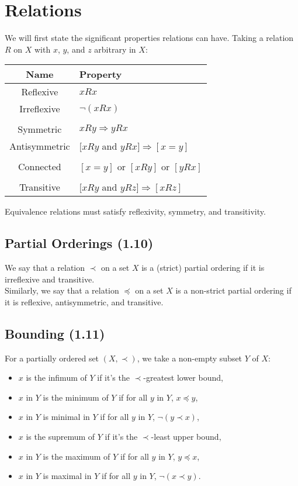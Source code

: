\section{Relations}

We will first state the significant properties relations
can have. Taking a relation $R$ on $X$ with $x$, $y$, and $z$
arbitrary in $X$: \begin{center}
    \begin{tabular}{ c l }
        \textbf{Name} & \textbf{Property} \\
        \hline
        Reflexive & $xRx$ \\
        Irreflexive & $\neg(xRx)$ \\
        \\
        Symmetric & $xRy \Rightarrow yRx$ \\
        Antisymmetric & $[xRy$ and $yRx] \Rightarrow [x = y]$ \\
        \\
        Connected & $[x = y]$ or $[xRy]$ or $[yRx]$ \\
        \\
        Transitive & $[xRy$ and $yRz] \Rightarrow [xRz]$ \\
    \end{tabular}
\end{center} Equivalence relations must satisfy 
reflexivity, symmetry, and transitivity.

\subsection{Partial Orderings (1.10)} \label{1.10}

We say that a relation $\prec$ on a set $X$ is a (strict) partial
ordering if it is irreflexive and transitive.
\\[\baselineskip]
Similarly, we say that a relation $\preceq$ on a set $X$ is a non-strict
partial ordering if it is reflexive, antisymmetric, and transitive.

\subsection{Bounding (1.11)} \label{1.11}

For a partially ordered set $(X, \prec)$, we take a non-empty subset $Y$ of $X$: 
\begin{itemize}
    \item $x$ is the infimum of $Y$ if it's the $\prec$-greatest lower bound,
    \item $x$ in $Y$ is the minimum of $Y$ if for all $y$ in $Y$, $x \preceq y$,
    \item $x$ in $Y$ is minimal in $Y$ if for all $y$ in $Y$, $\neg(y \prec x)$,
    \item $x$ is the supremum of $Y$ if it's the $\prec$-least upper bound,
    \item $x$ in $Y$ is the maximum of $Y$ if for all $y$ in $Y$, $y \preceq x$,
    \item $x$ in $Y$ is maximal in $Y$ if for all $y$ in $Y$, $\neg(x \prec y)$.
\end{itemize}

